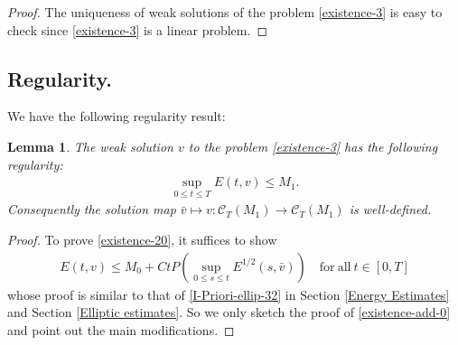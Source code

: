 \documentclass[11pt, reqno]{amsart}
\newtheorem{lemma}{Lemma}
\numberwithin{equation}{section}
\begin{document}
{\begin{proof}
The uniqueness of weak solutions of the problem \eqref{existence-3} is easy to check since \eqref{existence-3} is a linear problem. 



\end{proof}


\subsection{Regularity.}\label{Regularity}
We have the following regularity result:
\begin{lemma}\label{Regularity lemma} The weak solution \(v\) to the problem \eqref{existence-3} has the following regularity: 
	\begin{equation}\label{existence-20}
		\begin{aligned}
			\sup_{0\leq t\leq T}E(t,v)
			\leq M_1.
		\end{aligned}
	\end{equation}
Consequently the solution map \(\bar{v}\mapsto v:\mathcal{C}_T(M_1)\rightarrow \mathcal{C}_T(M_1)\) is well-defined. 

	
\end{lemma}

\begin{proof} To prove \eqref{existence-20}, it suffices to show
\begin{equation}\label{existence-add-0}
\begin{aligned}
E(t,v)
\leq M_0+CtP(\sup_{0\leq s\leq t}E^{1/2}(s,\bar{v}))\quad \mathrm{for\ all}\ t\in [0,T]
\end{aligned}
\end{equation}
whose proof is similar to that of \eqref{I-Priori-ellip-32} in Section \ref{Energy Estimates} and Section \ref{Elliptic estimates}. So we only sketch the proof of \eqref{existence-add-0} and point out the main modifications. 


\end{proof}}
\end{document}
